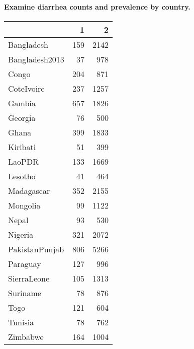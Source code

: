 \documentclass[
]{article}
\newenvironment{Shaded}{\begin{snugshade}}{\end{snugshade}}
\newcommand{\CommentTok}[1]{\textcolor[rgb]{0.56,0.35,0.01}{\textit{#1}}}
\newcommand{\DataTypeTok}[1]{\textcolor[rgb]{0.13,0.29,0.53}{#1}}
\newcommand{\DecValTok}[1]{\textcolor[rgb]{0.00,0.00,0.81}{#1}}
\newcommand{\KeywordTok}[1]{\textcolor[rgb]{0.13,0.29,0.53}{\textbf{#1}}}
\newcommand{\NormalTok}[1]{#1}
\newcommand{\OperatorTok}[1]{\textcolor[rgb]{0.81,0.36,0.00}{\textbf{#1}}}
\newcommand{\OtherTok}[1]{\textcolor[rgb]{0.56,0.35,0.01}{#1}}
\newcommand{\StringTok}[1]{\textcolor[rgb]{0.31,0.60,0.02}{#1}}
\begin{document}
\hypertarget{examine-diarrhea-counts-and-prevalence-by-country.}{%
\paragraph{Examine diarrhea counts and prevalence by
country.}\label{examine-diarrhea-counts-and-prevalence-by-country.}}

\begin{Shaded}
\end{Shaded}

\begin{longtable}[]{@{}lrr@{}}
\toprule
& 1 & 2\tabularnewline
\midrule
\endhead
Bangladesh & 159 & 2142\tabularnewline
Bangladesh2013 & 37 & 978\tabularnewline
Congo & 204 & 871\tabularnewline
CoteIvoire & 237 & 1257\tabularnewline
Gambia & 657 & 1826\tabularnewline
Georgia & 76 & 500\tabularnewline
Ghana & 399 & 1833\tabularnewline
Kiribati & 51 & 399\tabularnewline
LaoPDR & 133 & 1669\tabularnewline
Lesotho & 41 & 464\tabularnewline
Madagascar & 352 & 2155\tabularnewline
Mongolia & 99 & 1122\tabularnewline
Nepal & 93 & 530\tabularnewline
Nigeria & 321 & 2072\tabularnewline
PakistanPunjab & 806 & 5266\tabularnewline
Paraguay & 127 & 996\tabularnewline
SierraLeone & 105 & 1313\tabularnewline
Suriname & 78 & 876\tabularnewline
Togo & 121 & 604\tabularnewline
Tunisia & 78 & 762\tabularnewline
Zimbabwe & 164 & 1004\tabularnewline
\bottomrule
\end{longtable}

\begin{Shaded}
\end{Shaded}
\end{document}
